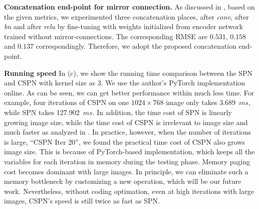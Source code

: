 \noindent\textbf{Concatenation end-point for mirror connection.} 
As discussed in , based on the given metrics, we experimented three concatenation places, \ie after \textit{conv}, after \textit{bn} and after \textit{relu} by fine-tuning with weights initialized from encoder network trained without mirror-connections.
The corresponding RMSE are  $0.531$, $0.158$ and $0.137$ correspondingly. Therefore, we adopt the proposed concatenation end-point.

\noindent\textbf{Running speed}
In  (c), we show the running time comparison between the SPN and CSPN with kernel size as $3$. We use the author's PyTorch implementation online. As can be seen, we can get better performance within much less time. For example, four iterations of CSPN on one $1024\times768$ image only takes 3.689~$ms$, while SPN takes 127.902~$ms$. In addition, the time cost of SPN is linearly growing \wrt image size, while the time cost of CSPN is irrelevant to image size and much faster as analyzed in . In practice, however, when the number of iterations is large, \eg ``CSPN Iter 20'', we found the practical time cost of CSPN also grows \wrt image size. This is because of PyTorch-based implementation, which keeps all the variables for each iteration in memory during the testing phase. Memory paging cost becomes dominant with large images. In principle, we can eliminate such a memory bottleneck by customizing a new operation, which will be our future work. Nevertheless, without coding optimation, even at high iterations with large images, CSPN's speed is still twice as fast as SPN. 

